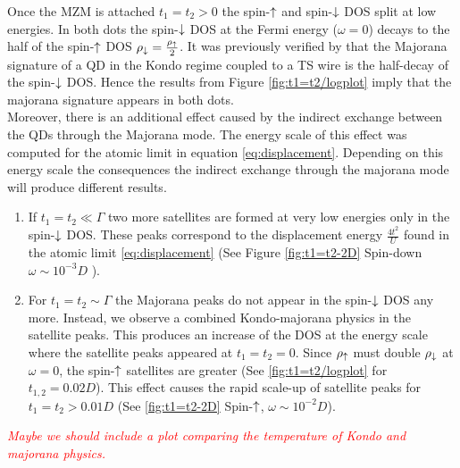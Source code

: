 \documentclass[showpacs,aps,prb,reprint,superscriptaddress]{revtex4-1}
\newcommand{\Jesus}[1]{\textcolor{red}{\fbox{Jesus} {\sl#1}}}
\begin{document}
    

Once the MZM is attached $t_1 =t_2 > 0$ the spin-$\uparrow$ and spin-$\downarrow$ DOS split at low energies. In both dots the spin-$\downarrow$ DOS at the Fermi energy ($\omega =0$) decays to the half of the spin-$\uparrow$ DOS $\rho_\downarrow = \frac{\rho_\uparrow}{2} $. It was previously verified  by  \citeauthor{ruiz-tijerina_interaction_2015} that the Majorana signature of a QD in the Kondo regime coupled to a TS wire is the half-decay of the spin-$\downarrow$ DOS. Hence the results from Figure \ref{fig:t1=t2/logplot} imply that the majorana signature appears in both dots. \\
    
Moreover, there is an additional effect caused by the indirect exchange between the QDs through the Majorana mode. The energy scale of this effect was computed for the atomic limit in equation \eqref{eq:displacement}. Depending on this energy scale the consequences the indirect exchange through the majorana mode will produce different results.

    
\begin{enumerate}
    \item If $t_1=t_2 \ll \Gamma $ two more satellites are formed at very low energies only in the spin-$\downarrow$ DOS. These peaks correspond to the displacement energy $\frac{4t^2}{U}$ found in the atomic limit \eqref{eq:displacement}  (See Figure \ref{fig:t1=t2-2D} Spin-down $\omega \sim 10^{-3}D$ ). 
    \item For $t_1=t_2 \sim \Gamma$ the Majorana peaks do not appear in the spin-$\downarrow$ DOS any more. Instead, we observe a combined Kondo-majorana physics in the satellite peaks. This produces an increase of the DOS at the energy scale where the satellite peaks appeared at $t_1=t_2=0$. Since $\rho_\uparrow$ must double $\rho_\downarrow$ at $\omega=0$, the spin-$\uparrow$ satellites are greater (See  \ref{fig:t1=t2/logplot} for $t_{1,2}=0.02D$). This effect causes the rapid scale-up of satellite peaks for $t_1=t_2>0.01D$  (See \ref{fig:t1=t2-2D} Spin-$\uparrow$, $\omega \sim 10^{-2}D$).
    
\end{enumerate}
    
    \Jesus{Maybe we should include a plot comparing the temperature of Kondo and majorana physics.}
\end{document}
